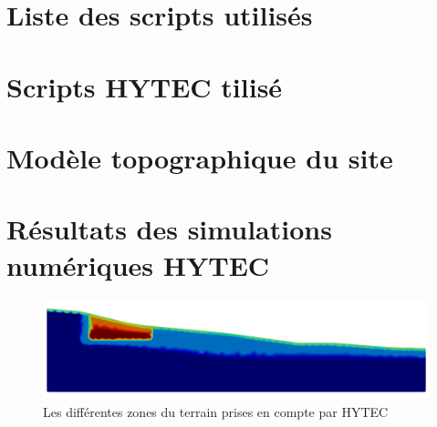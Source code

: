 \documentclass{article}
\begin{document}
\renewcommand\lstlistingname{Script n°}
\renewcommand\lstlistlistingname{}
\newpage
\section{Liste des scripts utilisés}
\lstlistoflistings
\newpage
\section{Scripts HYTEC tilisé }
\label{lst:modele_hydro_chimie_final}

\newpage

\newpage



\newpage
\section{Modèle topographique du site}

\label{lst:modele_topo}

\newpage
\label{lst:modele_radon_1_1}


\newpage
\label{lst:modele_radon_1_2}



\newpage
\label{lst:modele_radon_2}



\newpage
\section{Résultats des simulations numériques HYTEC}
\begin{figure}[H]
    \centering
    \includegraphics[width=\linewidth]{LJ-zones-HYTEC-final.png}
    \caption{Les différentes zones du terrain prises en compte par HYTEC}
    \label{fig:zones_HYTEC}
\end{figure}
\end{document}
